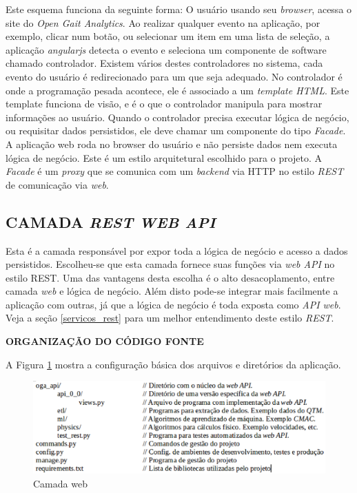 Este esquema funciona da seguinte forma: O usuário usando seu \emph{browser}, acessa o site do \emph{Open Gait Analytics}. 
Ao realizar qualquer evento na aplicação, por exemplo, clicar num botão, ou selecionar um item em uma lista de seleção, a aplicação \emph{angularjs} detecta o evento e seleciona um componente de software chamado controlador. 
Existem vários destes controladores no sistema, cada evento do usuário é redirecionado para um que seja adequado.
No controlador é onde a programação pesada acontece, ele é associado a um \emph{template HTML}. 
Este template funciona de visão, e é o que o controlador manipula para mostrar informações ao usuário.
Quando o controlador precisa executar lógica de negócio, ou requisitar dados persistidos, ele deve chamar um componente do tipo \emph{Facade}. 
A aplicação web roda no browser do usuário e não persiste dados nem executa lógica de negócio. 
Este é um estilo arquitetural escolhido para o projeto.
A \emph{Facade} é um \emph{proxy} que se comunica com um \emph{backend} via HTTP no estilo \emph{REST} de comunicação via \emph{web}.


\subsection{CAMADA \emph{REST WEB API}}

Esta é a camada responsável por expor toda a lógica de negócio e acesso a dados persistidos. Escolheu-se que esta camada fornece suas funções via \emph{web API} no estilo REST.
Uma das vantagens desta escolha é o alto desacoplamento, entre camada \emph{web} e lógica de negócio. 
Além disto pode-se integrar mais facilmente a aplicação com outras, já que a lógica de negócio é toda exposta como \emph{API web}. 
Veja a seção \ref{servicos_rest} para um melhor entendimento deste estilo \emph{REST}.

\textbf{ORGANIZAÇÃO DO CÓDIGO FONTE}

A Figura \ref{dir_api} mostra a configuração básica dos arquivos e diretórios da aplicação.

\begin{figure}[ht]
	\centering
	\includegraphics[width=15cm]{figuras/dir_api.eps}
	\caption{Camada web}
	\label{dir_api}
\end{figure}

